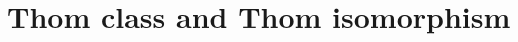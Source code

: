 \documentclass[dvipdfmx]{jsarticle}
\begin{document}
\newpage
\section{Thom class and Thom isomorphism}

\end{document}
